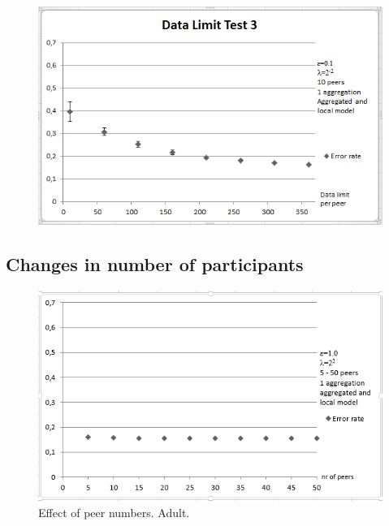 \begin{figure}[H]
	\hspace{1mm}
	\begin{minipage}{.65\linewidth}
		\includegraphics[width=\linewidth]{fig/spambase/data_limit_test_localmodelonly}
		\label{fig:data_limit_test_localmodelonly}
	\end{minipage}
\end{figure}


\subsection{Changes in number of participants}
\begin{figure}[H]
	\centering
	\includegraphics[width=\textwidth]{fig/adult/peer_range_constant_group}
	\caption{Effect of peer numbers. Adult.}
	\label{fig:peer_range_constant_group}
\end{figure}


